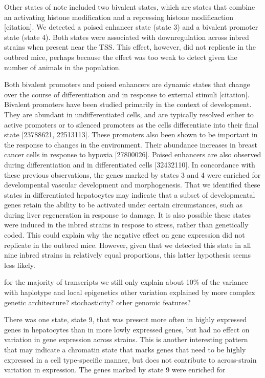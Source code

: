 \documentclass[10pt,letterpaper]{article}
\begin{document}
Other states of note included two bivalent states, which are states that
combine an activating histone modification and a repressing histone
modificaction {[}citation{]}. We detected a poised enhancer state (state
3) and a bivalent promoter state (state 4). Both states were associated
with downregulation across inbred strains when present near the TSS.
This effect, however, did not replicate in the outbred mice, perhaps
because the effect was too weak to detect given the number of animals in
the population.

Both bivalent promoters and poised enhancers are dynamic states that
change over the course of differentiation and in response to external
stimuli {[}citation{]}. Bivalent promoters have been studied primarily
in the context of development. They are abundant in undifferentiated
cells, and are typically resolved either to active promoters or to
silenced promoters as the cells differentiate into their final state
{[}23788621, 22513113{]}. These promoters also been shown to be
important in the response to changes in the environment. Their abundance
increases in breast cancer cells in response to hypoxia {[}27800026{]}.
Poised enhancers are also observed during differentiation and in
differentiated cells {[}32432110{]}. In concordance with these previous
observations, the genes marked by states 3 and 4 were enriched for
develompental vascular development and morphogenesis. That we identified
these states in differentiated hepatocytes may indicate that a subset of
developmental genes retain the ability to be activated under certain
circumstances, such as during liver regeneration in response to damage.
It is also possible these states were induced in the inbred strains in
respose to stress, rather than genetically coded. This could explain why
the negative effect on gene expression did not replicate in the outbred
mice. However, given that we detected this state in all nine inbred
strains in relatively equal proportions, this latter hypothesis seems
less likely.

for the majority of transcripts we still only explain about 10\% of the
variance with haplotype and local epigenetics other variation explained
by more complex genetic architecture? stochasticity? other genomic
features?

There was one state, state 9, that was present more often in highly
expressed genes in hepatocytes than in more lowly expressed genes, but
had no effect on variation in gene expression across strains. This is
another interesting pattern that may indicate a chromatin state that
marks genes that need to be highly expressed in a cell type-specific
manner, but does not contribute to across-strain variation in
expression. The genes marked by state 9 were enriched for
\end{document}
